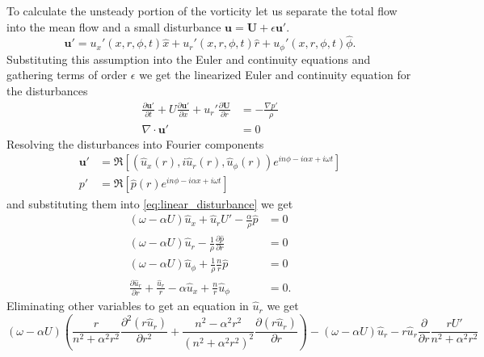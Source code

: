 \documentclass[superscriptaddress, onecolumn, prl]{revtex4}
\begin{document}
To calculate the unsteady portion of the vorticity let us separate the total flow into the mean flow and a small disturbance $\textbf{u} = \textbf{U} + \epsilon \textbf{u}'$.
\begin{equation}
\textbf{u}' = u_x'(x, r, \phi, t) \hat{x} + u_r'(x, r, \phi, t)  \hat{r} + u_\phi'(x, r, \phi, t)  \hat{\phi}.
\end{equation}
Substituting this assumption into the Euler and continuity equations and gathering terms of order $\epsilon$ we get the linearized Euler and continuity equation for the disturbances
\begin{equation}
\begin{split}
\label{eq:linear_disturbance}
\frac{\partial \textbf{u}' }{\partial t} + U \frac{\partial \textbf{u}'}{\partial x} + u_r' \frac{\partial \textbf{U}}{\partial r} &= -\frac{\nabla p'}{\rho} \\
\nabla \cdot \textbf{u}' &= 0 
\end{split}
\end{equation}
Resolving the disturbances into Fourier components
\begin{equation}
\begin{split}
 \textbf{u}' & = \Re \left[ \left( \hat{u}_x(r), i \hat{u}_r(r), \hat{u}_{\phi}(r) \right) e^{in\phi - i \alpha x + i \omega t}   \right] \\
 p' & = \Re \left[ \hat{p}(r) e^{in\phi - i \alpha x + i \omega t} \right]
\end{split}
\end{equation}
and substituting them into \ref{eq:linear_disturbance} we get
\begin{equation}
\begin{split}
(\omega - \alpha U )\hat{u}_x  + \hat{u}_r U' - \frac{\alpha}{\rho} \hat{p} & = 0 \\
(\omega -  \alpha U )\hat{u}_r - \frac{1}{\rho}\frac{\partial \hat{p}}{\partial r} & = 0 \\
(\omega -  \alpha U ) \hat{u}_{\phi} + \frac{1}{\rho}\frac{n}{r} \hat{p} & = 0 \\
\frac{\partial \hat{u}_r}{\partial r} + \frac{\hat{u}_r}{r} - \alpha \hat{u}_x + \frac{n}{r} \hat{u}_{\phi} &=0.  
\end{split}
\end{equation}
Eliminating other variables to get an equation in $\hat{u}_r$ we get 
\begin{equation}
(\omega - \alpha U) \left( \frac{r}{n^2 + \alpha^2 r^2} \frac{\partial^2 (r \hat{u}_r)}{\partial r^2}  + \frac{n^2-\alpha^2 r^2}{(n^2 + \alpha^2 r^2)^2} \frac{\partial (r \hat{u}_r)}{\partial r} \right)- (\omega - \alpha U) \hat{u}_r -r \hat{u}_r \frac{\partial}{\partial r} \frac{r U'}{n^2 + \alpha^2 r^2}   
\end{equation}
\end{document}
